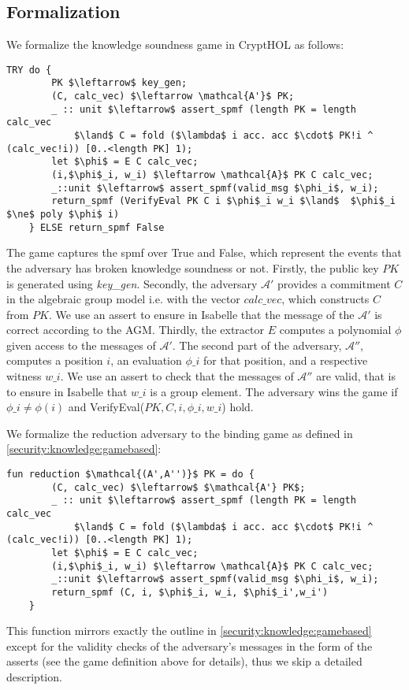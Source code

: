 \subsection{Formalization}
We formalize the knowledge soundness game in CryptHOL as follows: 
\begin{lstlisting}[language=isabelle]
    TRY do {
        PK $\leftarrow$ key_gen;
        (C, calc_vec) $\leftarrow \mathcal{A'}$ PK;
        _ :: unit $\leftarrow$ assert_spmf (length PK = length calc_vec 
            $\land$ C = fold ($\lambda$ i acc. acc $\cdot$ PK!i ^ (calc_vec!i)) [0..<length PK] 1);
        let $\phi$ = E C calc_vec;
        (i,$\phi$_i, w_i) $\leftarrow \mathcal{A}$ PK C calc_vec;
        _::unit $\leftarrow$ assert_spmf(valid_msg $\phi_i$, w_i);
        return_spmf (VerifyEval PK C i $\phi$_i w_i $\land$  $\phi$_i $\ne$ poly $\phi$ i)
    } ELSE return_spmf False
\end{lstlisting}
The game captures the spmf over True and False, which represent the events that the adversary has broken knowledge soundness or not.
Firstly, the public key $PK$ is generated using \textit{key\_gen}. 
Secondly, the adversary $\mathcal{A'}$ provides a commitment $C$ in the algebraic group model i.e. with the vector $calc\_vec$, which constructs $C$ from $PK$. We use an assert to ensure in Isabelle that the message of the $\mathcal{A'}$ is correct according to the AGM.
Thirdly, the extractor $E$ computes a polynomial $\phi$ given access to the messages of $\mathcal{A'}$. The second part of the adversary, $\mathcal{A''}$, computes a position $i$, an evaluation $\phi\_i$ for that position, and a respective witness $w\_i$. We use an assert to check that the messages of $\mathcal{A''}$ are valid, that is to ensure in Isabelle that $w\_i$ is a group element.
The adversary wins the game if $\phi\_i \ne \phi(i)$ and VerifyEval($PK,C,i,\phi\_i,w\_i$) hold.

We formalize the reduction adversary to the binding game as defined in \ref{security:knowledge:gamebased}: 
\begin{lstlisting}[language=isabelle]
    fun reduction $\mathcal{(A',A'')}$ PK = do {
        (C, calc_vec) $\leftarrow$ $\mathcal{A'} PK$;
        _ :: unit $\leftarrow$ assert_spmf (length PK = length calc_vec 
            $\land$ C = fold ($\lambda$ i acc. acc $\cdot$ PK!i ^ (calc_vec!i)) [0..<length PK] 1);
        let $\phi$ = E C calc_vec;
        (i,$\phi$_i, w_i) $\leftarrow \mathcal{A}$ PK C calc_vec;
        _::unit $\leftarrow$ assert_spmf(valid_msg $\phi_i$, w_i);
        return_spmf (C, i, $\phi$_i, w_i, $\phi$_i',w_i')
    }
\end{lstlisting}
This function mirrors exactly the outline in \ref{security:knowledge:gamebased} except for the validity checks of the adversary's messages in the form of the asserts (see the game definition above for details), thus we skip a detailed description. 